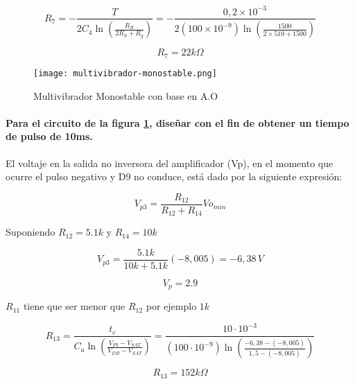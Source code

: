 \[
R_7 = - \frac{T}{2C_4 \ln \left( \frac{R_B}{2R_S + R_g} \right)} = - \frac{0,2 \times 10^{-3}}{2 (100 \times 10^{-9}) \ln \left( \frac{1500}{2 \times 510 + 1500} \right)}
\]

$$R_7 = 22k\Omega$$


\begin{figure}[ht]
    \centering
    \texttt{[image: multivibrador-monostable.png]}
    \caption{Multivibrador Monostable con base en A.O}
    \label{fig:multivibrador-monostable}
\end{figure}


\paragraph{Para el circuito de la figura \ref{fig:multivibrador-monostable}, diseñar con el fin de obtener un tiempo de pulso de 10ms. }

El voltaje en la salida no inversora del amplificador (Vp), en el momento que ocurre el pulso negativo y D9 no conduce, está dado por la siguiente expresión: 

\[
V_{p3} = \frac{R_{12}}{R_{12} + R_{14}} Vo_{min}
\]

Suponiendo $R_{12} = 5.1k$ y $R_14 = 10k$

\[
V_{p3} = \frac{5.1k}{10k + 5.1k} (-8,005) = -6,38\,V
\]

$$V_p = 2.9$$

$R_{11}$ tiene que ser menor que $R_{12}$ por ejemplo $1k$

\[
R_{13} = \frac{t_c}{C_a \ln \left( \frac{V_{P3} - V_{SAT}}{V_{DB} - V_{SAT}} \right)} = \frac{10 \cdot 10^{-3}}{(100 \cdot 10^{-9}) \ln \left( \frac{-6,38 - (-8,005)}{1,5 - (-8,005)} \right)}
\]

$$R_{13} = 152k\Omega$$